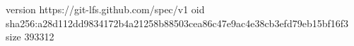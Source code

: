 version https://git-lfs.github.com/spec/v1
oid sha256:a28d112dd9834172b4a21258b88503cea86c47e9ac4e38cb3efd79eb15bf16f3
size 393312

